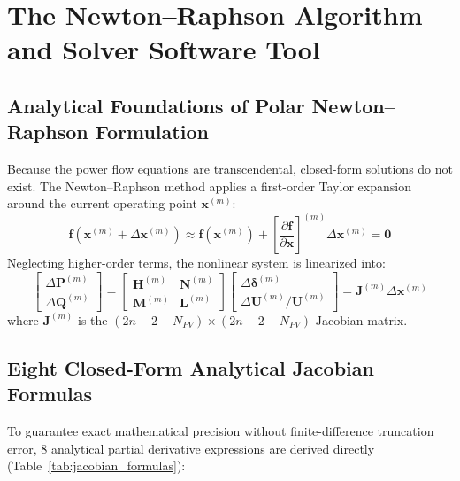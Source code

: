 \documentclass[12pt,a4paper,oneside]{report}
\begin{document}
\chapter{The Newton--Raphson Algorithm and Solver Software Tool}

\section{Analytical Foundations of Polar Newton--Raphson Formulation}
Because the power flow equations are transcendental, closed-form solutions do not exist. The Newton--Raphson method applies a first-order Taylor expansion around the current operating point $\mathbf{x}^{(m)}$:
\begin{equation}
\mathbf{f}(\mathbf{x}^{(m)} + \Delta \mathbf{x}^{(m)}) \approx \mathbf{f}(\mathbf{x}^{(m)}) + \left[ \frac{\partial \mathbf{f}}{\partial \mathbf{x}} \right]^{(m)} \Delta \mathbf{x}^{(m)} = \mathbf{0}
\end{equation}
Neglecting higher-order terms, the nonlinear system is linearized into:
\begin{equation}
\begin{bmatrix}
\Delta \mathbf{P}^{(m)} \\[4pt]
\Delta \mathbf{Q}^{(m)}
\end{bmatrix}
=
\begin{bmatrix}
\mathbf{H}^{(m)} & \mathbf{N}^{(m)} \\[4pt]
\mathbf{M}^{(m)} & \mathbf{L}^{(m)}
\end{bmatrix}
\begin{bmatrix}
\Delta \boldsymbol{\delta}^{(m)} \\[4pt]
\Delta \mathbf{U}^{(m)} / \mathbf{U}^{(m)}
\end{bmatrix}
= \mathbf{J}^{(m)} \Delta \mathbf{x}^{(m)}
\end{equation}
where $\mathbf{J}^{(m)}$ is the $(2n - 2 - N_{PV}) \times (2n - 2 - N_{PV})$ Jacobian matrix.

\section{Eight Closed-Form Analytical Jacobian Formulas}
To guarantee exact mathematical precision without finite-difference truncation error, 8 analytical partial derivative expressions are derived directly (Table~\ref{tab:jacobian_formulas}):
\end{document}
